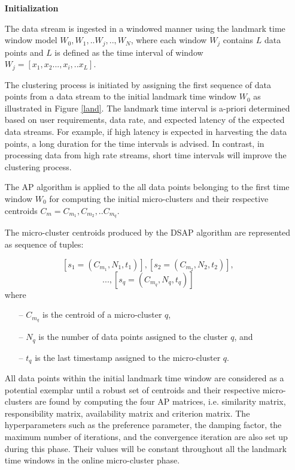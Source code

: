 \documentclass[../UNBThesis2.tex]{subfiles}
\begin{document}
\begin{itemize}[leftmargin=*]
  

\item[]\textbf{Initialization}


The data stream is ingested in a windowed manner using the landmark time window model $W_0, W_1, ..W_j, ..,W_N $, where each window $W_j$ contains $L$ data points and $L$ is defined as the time interval of window $W_j = [x_1,x_2...,x_i,..x_L]$.

The clustering process is initiated by assigning the first sequence of data points from a data stream to the initial landmark time window $W_0$ as illustrated in Figure \ref{land}. The landmark time interval is a-priori determined based on user requirements, data rate, and expected latency of the expected data streams. For example, if high latency is expected in harvesting the data points, a long duration for the time intervals is advised. In contrast, in processing data from high rate streams, short time intervals will improve the clustering process. 

The AP algorithm is applied to the all data points belonging to the first time window $W_0$ for computing the initial micro-clusters and their respective centroids $C_m = C_{m_1}, C_{m_2},..C_{m_q}$. 

The micro-cluster centroids produced by the DSAP algorithm are represented as sequence of tuples:
    
    \[    \left [  s_{1} =\left ( C_{m_1},N_{1},t_{1} \right )  \right ], \left [ s_{2} = \left ( C_{m_2},N_{2}, t_{2} \right ) \right ],\]
    \[...,\left [ s_q = \left ( C_{m_q}, N_q, t_{q} \right ) \right ] \]  
    where
    \begin{itemize}
        \item[--] $C_{m_q}$ is the centroid of a micro-cluster $q$,
        \item[--] $N_q$ is the number of data points assigned to the cluster $q$, and
        \item[--] $t_{q}$ is the last timestamp assigned to the micro-cluster $q$.
    \end{itemize}

All data points within the initial landmark time window are considered as a potential exemplar until a robust set of centroids and their respective micro-clusters are found by computing the four AP matrices, i.e. similarity matrix, responsibility matrix, availability matrix and criterion matrix. The hyperparameters such as the preference parameter, the damping factor, the maximum number of iterations, and the convergence iteration are also set up during this phase. Their values will be constant throughout all the landmark time windows in the online micro-cluster phase.


\end{itemize}
\end{document}
